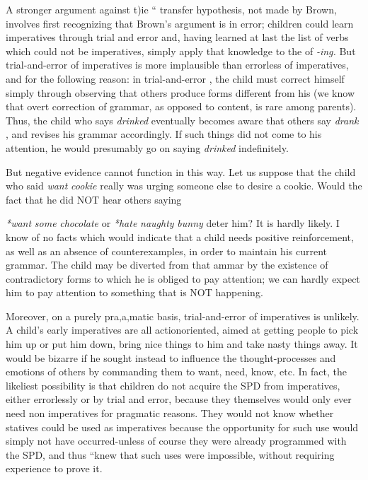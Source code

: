 A stronger argument against t)ie `` transfer hypothesis,
not made by Brown, involves first recognizing that Brown's argument is in error; children could learn imperatives through trial and error and, having learned at last the list of verbs which could not be imperatives, simply apply that knowledge to the  of \textit{{}-ing.} But trial-and-error  of imperatives is more implausible than errorless  of imperatives, and for the following reason: in trial-and-error , the child must correct himself simply through observing that others produce forms different from his (we know that overt correction of grammar, as opposed to content, is rare among parents). Thus, the child who says \textit{drinked} eventually becomes aware that others say \textit{drank} , and revises his grammar accordingly. If such things did not come to his attention, he would presumably go on saying \textit{d}\textit{rinked} indefinitely.

But negative evidence cannot function in this way. Let us sup\-pose that the child who said \textit{want} \textit{cookie} really was urging someone else to desire a cookie. Would the fact that he did NOT hear others saying

\textit{*want} \textit{some} \textit{chocolate} or \textit{*hate} \textit{naughty} \textit{bunny} deter him? It is hardly likely. I know of no facts which would indicate that a child needs positive reinforcement, as well as an absence of counterexamples, in order to maintain his current grammar. The child may be diverted from that ammar by the existence of contradictory forms to which he is obliged to pay attention; we can hardly expect him to pay atten\-tion to something that is NOT happening.

Moreover, on a purely pra,a,matic basis, trial-and-error  of imperatives is unlikely. A child's early imperatives are all action\-oriented, aimed at getting people to pick him up or put him down, bring nice things to him and take nasty things away. It would be bizarre if he sought instead to influence the thought-processes and emotions of others by commanding them to want, need, know, etc. In fact, the likeliest possibility is that children do not acquire the SPD from imperatives, either errorlessly or by trial and error, because they them\-selves would only ever need non imperatives for pragmatic reasons. They would not know whether statives could be used as imperatives because the opportunity for such use would simply not
have occurred-unless of course they were already programmed with the SPD, and thus ``knew that such uses were impossible, without requiring experience to prove it.

